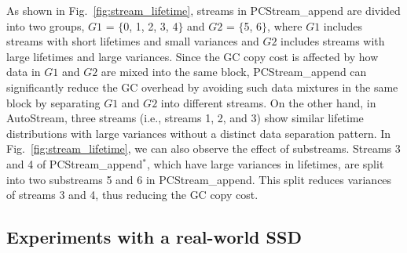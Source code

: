 As shown in Fig.~\ref{fig:stream_lifetime}, 
streams in \textsf{\small PCStream\_append} are divided into two groups, 
$G1$ = $\{$0, 1, 2, 3, 4$\}$ and $G2$ = $\{$5, 6$\}$, 
where $G1$ includes streams with short lifetimes and small variances %
and $G2$ includes streams with large lifetimes and large variances.  %
Since the GC copy cost is affected by how data in $G1$ and $G2$ are mixed into the same block, 
\textsf{\small PCStream\_append} can significantly reduce the GC overhead 
by avoiding such data mixtures in the same block by separating $G1$ and $G2$ into different streams. 
On the other hand, in \textsf{\small AutoStream}, 
three streams (i.e., streams 1, 2, and 3) show similar lifetime distributions with large variances 
without a distinct data separation pattern.
In Fig.~\ref{fig:stream_lifetime}, we can also observe the effect of substreams.  
Streams 3 and 4 of \textsf{\small PCStream\_append$^{*}$}, 
which have large variances in lifetimes, are split into two substreams 5 and 6 in \textsf{\small PCStream\_append}.
This split reduces variances of streams 3 and 4, thus reducing the GC copy cost.  %

\subsection{Experiments with a real-world SSD}

